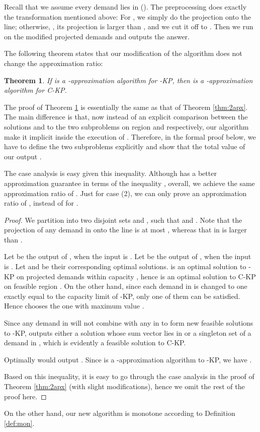 \documentclass{aamas2013}
\newtheorem{theorem}{Theorem}[section]
\begin{document}
\noindent Recall that we assume every demand  lies in  ().  The preprocessing  does exactly the transformation mentioned above: For , we simply do the projection onto the  line; otherwise, , its projection is larger than , and we cut it off to .  Then we run  on the modified projected demands and outputs the answer.  

The following theorem states that our modification of the algorithm does not change the approximation ratio:
\begin{theorem} 
\label{thm:2apxb}
If  is a -approximation algorithm for {-KP}, then  is a -approximation algorithm for {\sc C-KP}.
\end{theorem}

The proof of Theorem \ref{thm:2apxb} is essentially the same as that of Theorem \ref{thm:2apx}.  The main difference is that, now instead of an explicit comparison between the solutions  and  to the two subproblems on region  and  respectively, our algorithm make it implicit inside the execution of .  Therefore, in the formal proof below, we have to define the two subproblems explicitly and show that the total value of our output .  

The case analysis is easy given this inequality.  Although  has a better approximation guarantee in terms of the inequality , overall, we achieve the same approximation ratio of .  Just for case (2), we can only prove an approximation ratio of , instead of  for .  


\begin{proof}
We partition  into two disjoint sets  and , such that  and . Note that the projection of any demand in  onto the  line is at most , whereas that in  is larger than .


Let  be the output of , when the input is . Let  be the output of , when the input is .  Let  and  be their corresponding optimal solutions.   is an optimal solution to {-KP} on projected demands within capacity , hence is an optimal solution to {\sc C-KP} on feasible region .  On the other hand, since each demand in  is changed to one exactly equal to the capacity limit of {-KP}, only one of them can be satisfied.  Hence  chooses the one with maximum value .  

Since any demand in  will not combine with any in  to form new feasible solutions to {-KP},  outputs either a solution whose sum vector lies in  or a singleton set of a demand in , which is evidently a feasible solution to {\sc C-KP}.

Optimally  would output .  Since  is a -approximation algorithm to {-KP}, we have . 

Based on this inequality, it is easy to go through the case analysis in the proof of Theorem \ref{thm:2apx} (with slight modifications), hence we omit the rest of the proof here.  
\end{proof}
On the other hand, our new algorithm is monotone according to Definition \ref{def:mon}. 
\end{document}

